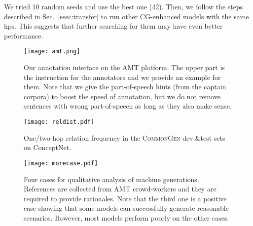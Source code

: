 \documentclass[11pt,a4paper]{article}
\begin{document}
 We tried 10 random seeds and use the best one (42).
 Then, we follow the steps described in Sec.~\ref{ssec:transfer} to run other CG-enhanced models with the same hps.
 This suggests that further searching for them may have even better performance.
 
	








    
 	\begin{figure*}[t!]
		\centering
		\texttt{[image: amt.png]}
		\caption{Our annotation interface on the AMT platform. The upper part is the instruction for the annotators and we provide an example for them. Note that we give the part-of-speech hints (from the captain corpora) to boost the speed of annotation, but we do not remove sentences with wrong part-of-speech as long as they also make sense.}
		\label{fig:amt}
	\end{figure*}
	
	
	\begin{figure*}[t!]
		\centering
		\texttt{[image: reldist.pdf]}
		\caption{One/two-hop relation frequency in the \textsc{CommonGen} dev.\&test sets on ConceptNet.}
		\label{fig:relationdist}
	\end{figure*}

		\begin{figure*}[t!]
		\centering
		\texttt{[image: morecase.pdf]}
		\caption{Four cases for qualitative analysis of machine generations. 
		References are collected from AMT crowd-workers and they are required to provide rationales. Note that the third one is a positive case showing that some models can successfully generate reasonable scenarios. However, most models perform poorly on the other cases.}
		\label{fig:morecase}
	\end{figure*}
	
    
	
	
\end{document}
